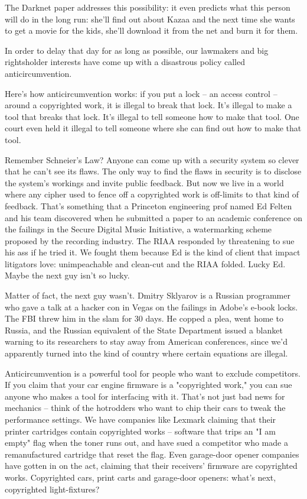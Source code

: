 The Darknet paper addresses this possibility: it even predicts what
this person will do in the long run: she'll find out about Kazaa
and the next time she wants to get a movie for the kids, she'll
download it from the net and burn it for them.

In order to delay that day for as long as possible, our lawmakers
and big rightsholder interests have come up with a disastrous
policy called anticircumvention.

Here's how anticircumvention works: if you put a lock -- an access
control -- around a copyrighted work, it is illegal to break that
lock. It's illegal to make a tool that breaks that lock. It's
illegal to tell someone how to make that tool. One court even held
it illegal to tell someone where she can find out how to make that
tool.

Remember Schneier's Law? Anyone can come up with a security system
so clever that he can't see its flaws. The only way to find the
flaws in security is to disclose the system's workings and invite
public feedback. But now we live in a world where any cipher used
to fence off a copyrighted work is off-limits to that kind of
feedback. That's something that a Princeton engineering prof named
Ed Felten and his team discovered when he submitted a paper to an
academic conference on the failings in the Secure Digital Music
Initiative, a watermarking scheme proposed by the recording
industry. The RIAA responded by threatening to sue his ass if he
tried it. We fought them because Ed is the kind of client that
impact litigators love: unimpeachable and clean-cut and the RIAA
folded. Lucky Ed. Maybe the next guy isn't so lucky.

Matter of fact, the next guy wasn't. Dmitry Sklyarov is a Russian
programmer who gave a talk at a hacker con in Vegas on the failings
in Adobe's e-book locks. The FBI threw him in the slam for 30 days.
He copped a plea, went home to Russia, and the Russian equivalent
of the State Department issued a blanket warning to its researchers
to stay away from American conferences, since we'd apparently
turned into the kind of country where certain equations are
illegal.

Anticircumvention is a powerful tool for people who want to exclude
competitors. If you claim that your car engine firmware is a
"copyrighted work," you can sue anyone who makes a tool for
interfacing with it. That's not just bad news for mechanics --
think of the hotrodders who want to chip their cars to tweak the
performance settings. We have companies like Lexmark claiming that
their printer cartridges contain copyrighted works -- software that
trips an "I am empty" flag when the toner runs out, and have sued a
competitor who made a remanufactured cartridge that reset the flag.
Even garage-door opener companies have gotten in on the act,
claiming that their receivers' firmware are copyrighted works.
Copyrighted cars, print carts and garage-door openers: what's next,
copyrighted light-fixtures?

